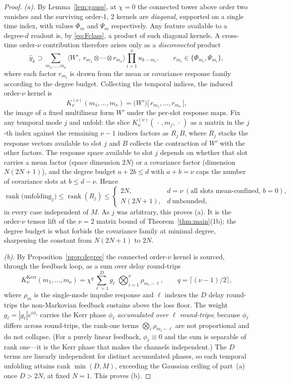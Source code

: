 \documentclass[11pt]{article}
\theoremstyle{remark}
\newcommand{\Kerr}{\mathrm{Kerr}}
\begin{document}
\begin{proof}
\emph{(a).} By Lemma~\ref{lem:gauss}, at $\chi=0$ the connected tower above order
two vanishes and the surviving order-1, 2 kernels are \emph{diagonal}, supported
on a single time index, with values $\Phi_m$ and $\Psi_m$ respectively. Any
feature available to a degree-$d$ readout is, by \eqref{eq:Fclass}, a product of
such diagonal kernels. A cross-time order-$\nu$ contribution therefore arises only
as a \emph{disconnected} product
\[
\hat y_k \supset \sum_{m_1,\dots,m_\nu}
\big\langle W',\ r_{m_1}\otimes\cdots\otimes r_{m_\nu}\big\rangle
\prod_{i=1}^\nu u_{k-m_i},
\qquad r_{m_i}\in\{\Phi_{m_i},\Psi_{m_i}\},
\]
where each factor $r_{m_i}$ is drawn from the mean or covariance response family
according to the degree budget. Collecting the temporal indices, the induced
order-$\nu$ kernel is
\[
K^{(\nu)}_\nu(m_1,\dots,m_\nu)
= \big(W'\big)\big[\,r_{m_1},\dots,r_{m_\nu}\,\big],
\]
the image of a fixed multilinear form $W'$ under the per-slot response maps. Fix any
temporal mode $j$ and unfold: the slice
$K^{(\nu)}_\nu(\,\cdot\,,m_j,\,\cdot\,)$ as a matrix in the $j$-th index against
the remaining $\nu-1$ indices factors as $R_j\,B$, where $R_j$ stacks the response
vectors available to slot $j$ and $B$ collects the contraction of $W'$ with the
other factors. The response space available to slot $j$ depends on whether that
slot carries a mean factor (space dimension $2N$) or a covariance factor
(dimension $N(2N{+}1)$), and the degree budget $a+2b\le d$ with $a+b=\nu$ caps the
number of covariance slots at $b\le d-\nu$. Hence
\[
\operatorname{rank}\big(\text{unfolding}_j\big)\le\operatorname{rank}(R_j)
\le \begin{cases} 2N, & d=\nu\ (\text{all slots mean-confined, }b=0),\\
N(2N{+}1), & d\ \text{unbounded},\end{cases}
\]
in every case independent of $M$. As $j$ was arbitrary, this proves (a). It is the
order-$\nu$ tensor lift of the $\nu=2$ matrix bound of
Theorem~\ref{thm:main}(1b); the degree budget is what forbids the covariance
family at minimal degree, sharpening the constant from $N(2N{+}1)$ to $2N$.

\emph{(b).} By Proposition~\ref{prop:degree} the connected order-$\nu$ kernel is
sourced, through the feedback loop, as a sum over delay round-trips
\[
K^{\Kerr}_\nu(m_1,\dots,m_\nu)
= \chi^{q}\sum_{\ell=1}^{D} g_\ell\;
\bigotimes_{i=1}^\nu \rho_{m_i-\ell} ,
\qquad q=\lceil(\nu-1)/2\rceil,
\]
where $\rho_m$ is the single-mode impulse response and $\ell$ indexes the $D$
delay round-trips the non-Markovian feedback sustains above the loss floor. The
weight $g_\ell=|g_\ell|e^{i\phi_\ell}$ carries the Kerr phase $\phi_\ell$
\emph{accumulated over $\ell$ round-trips}; because $\phi_\ell$ differs across
round-trips, the rank-one terms $\bigotimes_i\rho_{m_i-\ell}$ are not proportional
and do not collapse. (For a purely linear feedback, $\phi_\ell\equiv0$ and the sum
is separable of rank one---it is the Kerr phase that makes the channels
independent.) The $D$ terms are linearly independent for distinct accumulated
phases, so each temporal unfolding attains rank $\min(D,M)$, exceeding the
Gaussian ceiling of part~(a) once $D>2N$, at fixed $N=1$. This proves (b).


\end{proof}
\end{document}
